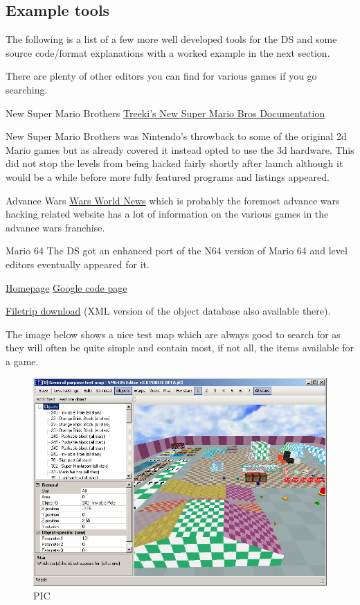 \documentclass[
]{book}
\begin{document}
\hypertarget{example-tools}{%
\subsection{Example tools}\label{example-tools}}

The following is a list of a few more well developed tools for the DS and some source code/format explanations with a worked example in the next section.

There are plenty of other editors you can find for various games if you go searching.

New Super Mario Brothers \href{http://treeki.rustedlogic.net/romhacking/docs.html}{Treeki's New Super Mario Bros Documentation}

New Super Mario Brothers was Nintendo's throwback to some of the original 2d Mario games but as already covered it instead opted to use the 3d hardware. This did not stop the levels from being hacked fairly shortly after launch although it would be a while before more fully featured programs and listings appeared.

Advance Wars \href{http://www.warsworldnews.com/index.php?page=mapsindex.html}{Wars World News} which is probably the foremost advance wars hacking related website has a lot of information on the various games in the advance wars franchise.

Mario 64 The DS got an enhanced port of the N64 version of Mario 64 and level editors eventually appeared for it.

\href{http://kuribo64.cjb.net/downloads.php}{Homepage} \href{http://sm64dse.googlecode.com/svn/trunk/}{Google code page}

\href{http://filetrip.net/nds-downloads/rom-hacks/download-sm64ds-editor-mario-64-ds-20-beta-3-f29354.html}{Filetrip download} (XML version of the object database also available there).

The image below shows a nice test map which are always good to search for as they will often be quite simple and contain most, if not all, the items available for a game.

\begin{figure}
\centering
\includegraphics{images/167_home_fast6191_romhackingguide_unrenamed_fil___nal_borders_romhackguideleveleditingMario64.png}
\caption{PIC}
\end{figure}
\end{document}
